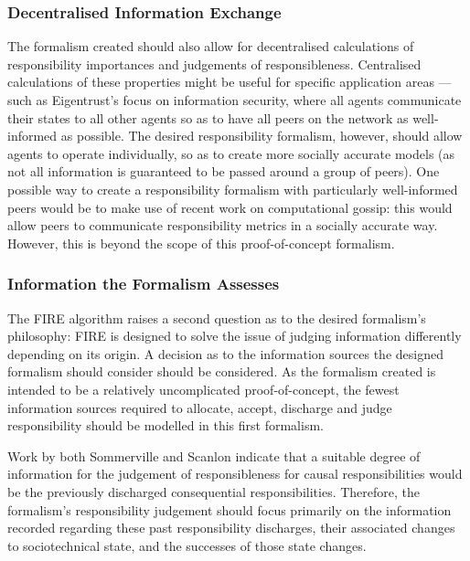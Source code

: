 \subsubsection{Decentralised Information Exchange}
The formalism created should also allow for decentralised calculations of responsibility importances and judgements of responsibleness. Centralised calculations of these properties might be useful for specific application areas --- such as Eigentrust's focus on information security, where all agents communicate their states to all other agents so as to have all peers on the network as well-informed as possible. The desired responsibility formalism, however, should allow agents to operate individually, so as to create more socially accurate models (as not all information is guaranteed to be passed around a group of peers). One possible way to create a responsibility formalism with particularly well-informed peers would be to make use of recent work on computational gossip\cite{Boyd2006,Lavaei2012}: this would allow peers to communicate responsibility metrics in a socially accurate way. However, this is beyond the scope of this proof-of-concept formalism.\par

\subsubsection{Information the Formalism Assesses}
The FIRE algorithm raises a second question as to the desired formalism's philosophy: FIRE is designed to solve the issue of judging information differently depending on its origin. A decision as to the information sources the designed formalism should consider should be considered. As the formalism created is intended to be a relatively uncomplicated proof-of-concept, the fewest information sources required to allocate, accept, discharge and judge responsibility should be modelled in this first formalism.\par

Work by both Sommerville and Scanlon indicate that a suitable degree of information for the judgement of responsibleness for causal responsibilities would be the previously discharged consequential responsibilities. Therefore, the formalism's responsibility judgement should focus primarily on the information recorded regarding these past responsibility discharges, their associated changes to sociotechnical state, and the successes of those state changes.\par

